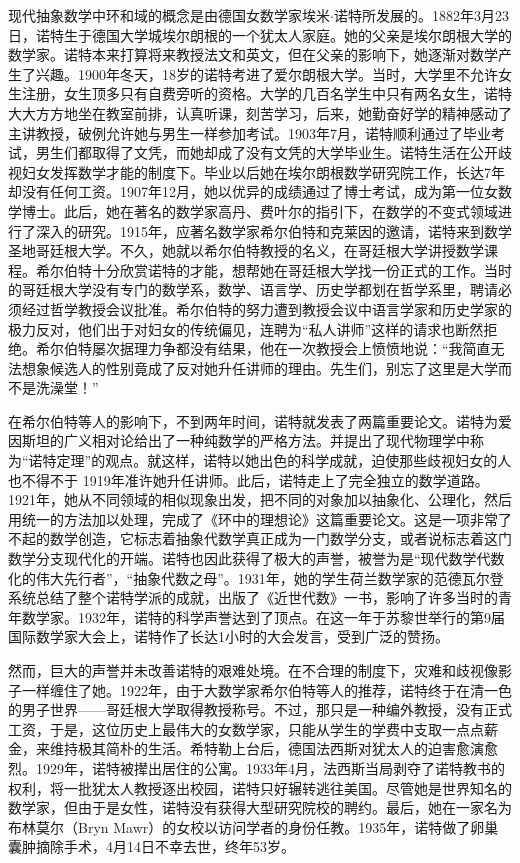 \documentclass{article}
\begin{document}
现代抽象数学中环和域的概念是由德国女数学家埃米$\cdot$诺特所发展的。1882年3月23日，诺特生于德国大学城埃尔朗根的一个犹太人家庭。她的父亲是埃尔朗根大学的数学家。诺特本来打算将来教授法文和英文，但在父亲的影响下，她逐渐对数学产生了兴趣。1900年冬天，18岁的诺特考进了爱尔朗根大学。当时，大学里不允许女生注册，女生顶多只有自费旁听的资格。大学的几百名学生中只有两名女生，诺特大大方方地坐在教室前排，认真听课，刻苦学习，后来，她勤奋好学的精神感动了主讲教授，破例允许她与男生一样参加考试。1903年7月，诺特顺利通过了毕业考试，男生们都取得了文凭，而她却成了没有文凭的大学毕业生。诺特生活在公开歧视妇女发挥数学才能的制度下。毕业以后她在埃尔朗根数学研究院工作，长达7年却没有任何工资。1907年12月，她以优异的成绩通过了博士考试，成为第一位女数学博士。此后，她在著名的数学家高丹、费叶尔的指引下，在数学的不变式领域进行了深入的研究。1915年，应著名数学家希尔伯特和克莱因的邀请，诺特来到数学圣地哥廷根大学。不久，她就以希尔伯特教授的名义，在哥廷根大学讲授数学课程。希尔伯特十分欣赏诺特的才能，想帮她在哥廷根大学找一份正式的工作。当时的哥廷根大学没有专门的数学系，数学、语言学、历史学都划在哲学系里，聘请必须经过哲学教授会议批准。希尔伯特的努力遭到教授会议中语言学家和历史学家的极力反对，他们出于对妇女的传统偏见，连聘为“私人讲师”这样的请求也断然拒绝。希尔伯特屡次据理力争都没有结果，他在一次教授会上愤愤地说：“我简直无法想象候选人的性别竟成了反对她升任讲师的理由。先生们，别忘了这里是大学而不是洗澡堂！”

在希尔伯特等人的影响下，不到两年时间，诺特就发表了两篇重要论文。诺特为爱因斯坦的广义相对论给出了一种纯数学的严格方法。并提出了现代物理学中称为“诺特定理”的观点。就这样，诺特以她出色的科学成就，迫使那些歧视妇女的人也不得不于 1919年准许她升任讲师。此后，诺特走上了完全独立的数学道路。1921年，她从不同领域的相似现象出发，把不同的对象加以抽象化、公理化，然后用统一的方法加以处理，完成了《环中的理想论》这篇重要论文。这是一项非常了不起的数学创造，它标志着抽象代数学真正成为一门数学分支，或者说标志着这门数学分支现代化的开端。诺特也因此获得了极大的声誉，被誉为是“现代数学代数化的伟大先行者”，“抽象代数之母”。1931年，她的学生荷兰数学家的范德瓦尔登系统总结了整个诺特学派的成就，出版了《近世代数》一书，影响了许多当时的青年数学家。1932年，诺特的科学声誉达到了顶点。在这一年于苏黎世举行的第9届国际数学家大会上，诺特作了长达1小时的大会发言，受到广泛的赞扬。

然而，巨大的声誉并未改善诺特的艰难处境。在不合理的制度下，灾难和歧视像影子一样缠住了她。1922年，由于大数学家希尔伯特等人的推荐，诺特终于在清一色的男子世界——哥廷根大学取得教授称号。不过，那只是一种编外教授，没有正式工资，于是，这位历史上最伟大的女数学家，只能从学生的学费中支取一点点薪金，来维持极其简朴的生活。希特勒上台后，德国法西斯对犹太人的迫害愈演愈烈。1929年，诺特被撵出居住的公寓。1933年4月，法西斯当局剥夺了诺特教书的权利，将一批犹太人教授逐出校园，诺特只好辗转逃往美国。尽管她是世界知名的数学家，但由于是女性，诺特没有获得大型研究院校的聘约。最后，她在一家名为布林莫尔（Bryn Mawr）的女校以访问学者的身份任教。1935年，诺特做了卵巢囊肿摘除手术，4月14日不幸去世，终年53岁。
\end{document}
